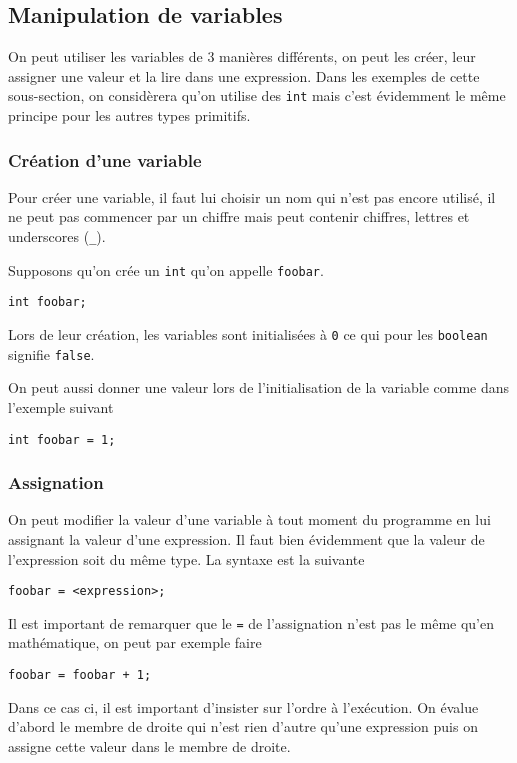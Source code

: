 \subsection{Manipulation de variables}
On peut utiliser les variables de 3 manières différents, on peut les créer,
leur assigner une valeur et la lire dans une expression.
Dans les exemples de cette sous-section, on considèrera qu'on utilise des
\lstinline|int| mais c'est évidemment le même principe pour les autres types
primitifs.

\subsubsection{Création d'une variable}
Pour créer une variable, il faut lui choisir un nom qui n'est pas encore
utilisé, il ne peut pas commencer par un chiffre mais peut contenir chiffres,
lettres et underscores (\lstinline|_|).

Supposons qu'on crée un \lstinline|int| qu'on appelle \lstinline|foobar|.
\begin{lstlisting}
int foobar;
\end{lstlisting}
Lors de leur création,
les variables sont initialisées à \lstinline|0| ce qui pour
les \lstinline|boolean| signifie \lstinline|false|.

On peut aussi donner une valeur lors de l'initialisation de la variable
comme dans l'exemple suivant
\begin{lstlisting}
int foobar = 1;
\end{lstlisting}

\subsubsection{Assignation}
On peut modifier la valeur d'une variable à tout moment du programme en lui
assignant la valeur d'une expression. Il faut bien évidemment que la valeur
de l'expression soit du même type. La syntaxe est la suivante
\begin{lstlisting}
foobar = <expression>;
\end{lstlisting}

Il est important de remarquer que le \lstinline|=| de l'assignation n'est pas le
même qu'en mathématique, on peut par exemple faire
\begin{lstlisting}
foobar = foobar + 1;
\end{lstlisting}

Dans ce cas ci, il est important d'insister sur l'ordre à l'exécution.
On évalue d'abord le membre de droite qui n'est rien d'autre qu'une expression
puis on assigne cette valeur dans le membre de droite.

